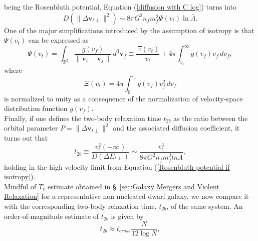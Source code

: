 \documentclass[12pt,twoside,openany]{book}
\begin{document}
being the Rosenbluth potential, Equation (\ref{diffusion with C log}) turns into
\begin{equation}
D(\|\Delta \mathbf{v}_{t\perp}\|^2) \sim 8\pi G^2 n_f m_f^2 \Psi(v_t)\ln{\bar{\Lambda}}.
\end{equation}
One of the major simplifications introduced by the assumption of isotropy is that $\Psi(v_t)$ can be expressed as
\begin{equation}\label{Rosenbluth potential if isotropy}
\Psi(v_t) = \int_{\mathbb{R}^3} \frac{g(v_f)}{\|\mathbf{v}_t - \mathbf{v}_f\|} \, d^3 \mathbf{v}_f
\equiv \frac{\Xi(v_t)}{v_t} + 4\pi \int_{v_t}^{\infty} g(v_f) v_f \, dv_f,
\end{equation}
where
\begin{equation}
\Xi(v_t) = 4\pi \int_{0}^{v_t} g(v_f) v_f^2 \, dv_f
\end{equation}
is normalized to unity as a consequence of the normalization of velocity-space distribution function $g(v_f)$.\\Finally, if one defines the two-body relaxation time $t_{2b}$ as the ratio between the orbital parameter $P=\|\Delta \mathbf{v}_{t\perp}\|^2$ and the associated diffusion coefficient, it turns out that
\begin{equation}\label{t_2b}
    t_{2b}\equiv\frac{v_t^2(-\infty)}{D(\Delta E_{t\perp})}\sim \frac{v_t^3}{8\pi G^2n_fm_f^2ln\bar\Lambda},
\end{equation}
holding in the high velocity limit from Equation (\ref{Rosenbluth potential if isotropy}).\\Mindful of $T_r$ estimate obtained in \S~\ref{sec:Galaxy Mergers and Violent Relaxation} for a representative non-nucleated dwarf galaxy, we now compare it with the corresponding two-body relaxation time, $t_{2b}$, of the same system. An order-of-magnitude estimate of $t_{2b}$ is given by
\begin{equation}\label{t_2b approx}
t_{2b}\approx t_{cross}\frac{N}{12\log{N}},
\end{equation}
\end{document}
